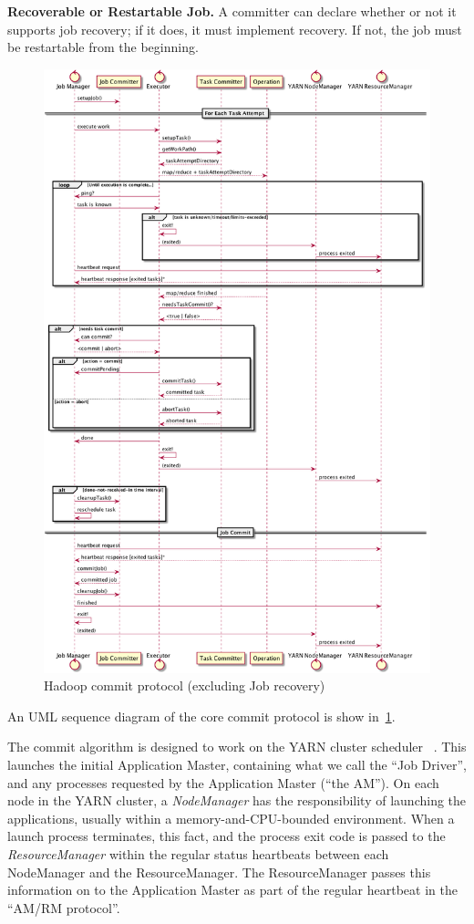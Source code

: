 \documentclass[conference]{IEEEtran}
\begin{document}
\textbf{Recoverable or Restartable Job.}
A committer can declare whether or not it supports job recovery;
if it does, it must implement recovery.
If not, the job must be restartable from the beginning.

\begin{figure}
  \centering
  \includegraphics[width=.8\textwidth]{commit-protocol.png}
  \caption{Hadoop commit protocol (excluding Job recovery)}
  \label{fig:commit-protocol}
\end{figure}

An UML sequence diagram of the core commit protocol is
show in\ \ref{fig:commit-protocol}.

The commit algorithm is designed to work on the YARN cluster scheduler
\ \cite{Vavilapalli2013}.
This launches the initial Application Master, containing what we call
the ``Job Driver'', and any processes requested by the Application Master
(``the AM'').
On each node in the YARN cluster, a \emph{NodeManager} has the responsibility
of launching the applications, usually within a memory-and-CPU-bounded
environment.
When a launch process terminates, this fact, and the process exit code
is passed to the \emph{ResourceManager} within the regular status heartbeats
between each NodeManager and the ResourceManager.
The ResourceManager passes this information on to the Application Master
as part of the regular heartbeat in the ``AM/RM protocol''.
\end{document}

